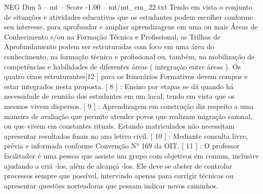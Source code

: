 \begin{textsample}{NEG Dim 5 – mt – Score -1.00 – mt/mt\_em\_22.txt}
Tendo em vista o conjunto de situações e atividades educativas que os estudantes podem escolher conforme seu interesse, para aprofundar e ampliar aprendizagens em uma ou mais Áreas de Conhecimento e/ou na Formação Técnica e Profissional, as Trilhas de Aprofundamento podem ser estruturadas com foco em uma área do conhecimento, na formação técnica e profissional ou, também, na mobilização de competências e habilidades de diferentes áreas ( integração entre áreas ).
Os quatro eixos estruturantes[12 ] para os Itinerários Formativos devem compor e estar integrados nesta proposta. [ 8 ] : Ensino por etapas se dá quando há necessidade de reunião dos estudantes em um local, tendo em vista que os mesmos vivem dispersos. [ 9 ] : Aprendizagem em construção diz respeito a uma maneira de avaliação que permite atender povos que realizam migração sazonal, ou que vivem em constantes rituais.
Estando matriculados não necessitam apresentar resultados finais no ano letivo civil. [ 10 ] : Mediante consulta livre, prévia e informada conforme Convenção N{\EmojiFont °} 169 da OIT. [ 11 ] : O professor facilitador é uma pessoa que assiste um grupo com objetivos em comum, inclusive ajudando a criá -los, além de alcançá -los.
Ele deve se abster de controlar processos sempre que possível, intervindo apenas para corrigir técnicas ou apresentar questões norteadoras que possam indicar novos caminhos.

\end{textsample}
